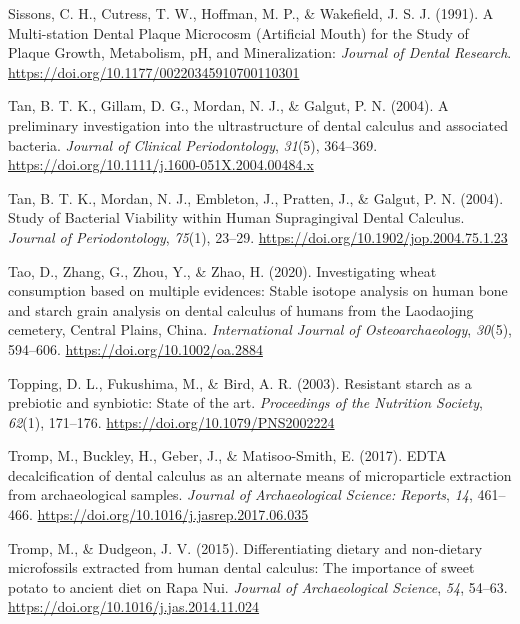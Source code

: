 \documentclass[
  letterpaper,
]{book}
\newlength{\cslhangindent}
\newlength{\cslentryspacingunit} %
\newenvironment{CSLReferences}[2] %
 {%
  \setlength{\parindent}{0pt}
  \ifodd #1
  \let\oldpar\par
  \def\par{\hangindent=\cslhangindent\oldpar}
  \fi
  \setlength{\parskip}{#2\cslentryspacingunit}
 }%
 {}
\begin{document}
\begin{CSLReferences}{1}{0}
\leavevmode{}%
Sissons, C. H., Cutress, T. W., Hoffman, M. P., \& Wakefield, J. S. J.
(1991). A {Multi-station Dental Plaque Microcosm} ({Artificial Mouth})
for the {Study} of {Plaque Growth}, {Metabolism}, {pH}, and
{Mineralization}: \emph{Journal of Dental Research}.
\url{https://doi.org/10.1177/00220345910700110301}

\leavevmode{}%
Tan, B. T. K., Gillam, D. G., Mordan, N. J., \& Galgut, P. N. (2004). A
preliminary investigation into the ultrastructure of dental calculus and
associated bacteria. \emph{Journal of Clinical Periodontology},
\emph{31}(5), 364--369.
\url{https://doi.org/10.1111/j.1600-051X.2004.00484.x}

\leavevmode{}%
Tan, B. T. K., Mordan, N. J., Embleton, J., Pratten, J., \& Galgut, P.
N. (2004). Study of {Bacterial Viability} within {Human Supragingival
Dental Calculus}. \emph{Journal of Periodontology}, \emph{75}(1),
23--29. \url{https://doi.org/10.1902/jop.2004.75.1.23}

\leavevmode{}%
Tao, D., Zhang, G., Zhou, Y., \& Zhao, H. (2020). Investigating wheat
consumption based on multiple evidences: {Stable} isotope analysis on
human bone and starch grain analysis on dental calculus of humans from
the {Laodaojing} cemetery, {Central Plains}, {China}.
\emph{International Journal of Osteoarchaeology}, \emph{30}(5),
594--606. \url{https://doi.org/10.1002/oa.2884}

\leavevmode{}%
Topping, D. L., Fukushima, M., \& Bird, A. R. (2003). Resistant starch
as a prebiotic and synbiotic: State of the art. \emph{Proceedings of the
Nutrition Society}, \emph{62}(1), 171--176.
\url{https://doi.org/10.1079/PNS2002224}

\leavevmode{}%
Tromp, M., Buckley, H., Geber, J., \& Matisoo-Smith, E. (2017). {EDTA}
decalcification of dental calculus as an alternate means of
microparticle extraction from archaeological samples. \emph{Journal of
Archaeological Science: Reports}, \emph{14}, 461--466.
\url{https://doi.org/10.1016/j.jasrep.2017.06.035}

\leavevmode{}%
Tromp, M., \& Dudgeon, J. V. (2015). Differentiating dietary and
non-dietary microfossils extracted from human dental calculus: The
importance of sweet potato to ancient diet on {Rapa Nui}. \emph{Journal
of Archaeological Science}, \emph{54}, 54--63.
\url{https://doi.org/10.1016/j.jas.2014.11.024}


\end{CSLReferences}
\end{document}
